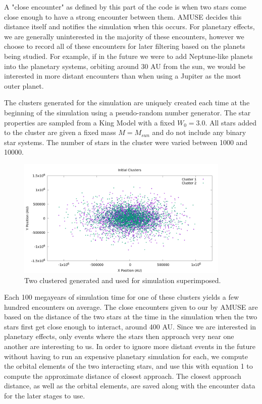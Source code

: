 \documentclass[12pt]{article}
\begin{document}
    A "close encounter" as defined by this part of the code is when two stars
    come close enough to have a strong encounter between them. AMUSE decides
    this distance itself and notifies the simulation when this occurs. For planetary
    effects, we are generally uninterested in the majority of these encounters, however
    we choose to record all of these encounters for later filtering based on the
    planets being studied. For example, if in the future we were to add Neptune-like
    planets into the planetary systems, orbiting around 30 AU from the sun, we would
    be interested in more distant encounters than when using a Jupiter as the most
    outer planet.

    The clusters generated for the simulation are uniquely created each time at the
    beginning of the simulation using a pseudo-random number generator. 
    The star properties are sampled from a
    King Model with a fixed $W_0=3.0$. %
    All stars added to the cluster are given a fixed mass $M=M_{sun}$ and do not
    include any binary star systems. The number
    of stars in the cluster were varied between 1000 and 10000. 

    \begin{figure}[h]
        \centering
        \caption{Two clustered generated and used for simulation superimposed.}
        \includegraphics[width=4.0in]{cluster_superimposed.png}
    \end{figure}

    Each 100 megayears of simulation time for one of these clusters yields a
    few hundred encounters on average. The close encounters given to our by 
    AMUSE are based on the distance of the two stars at the time in the simulation
    when the two stars first get close enough to interact, around 400 AU.
    Since we are interested in planetary effects, only events where the stars
    then approach very near one another are interesting to us. In order to
    ignore more distant events in the future without having to run an expensive 
    planetary simulation for each, we compute the orbital elements of the two
    interacting stars, and use this with equation 1 to compute the approximate
    distance of closest approach. The closest approach distance, as well as 
    the orbital elements, are saved along with the encounter data for the later
    stages to use.
\end{document}
